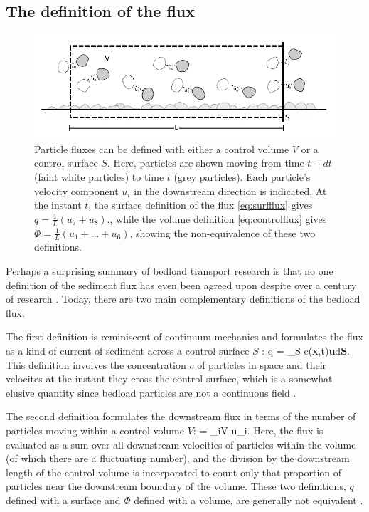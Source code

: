 \subsection{The definition of the flux}
\begin{figure}[!htbp]
	\includegraphics[width=\linewidth,keepaspectratio]{./figures/ch1/fluxDefinitions.pdf}
	\caption{Particle fluxes can be defined with either a control volume $V$ or a control surface $S$. Here, particles are shown moving from time $t-dt$ (faint white particles) to time $t$ (grey particles). Each particle's velocity component $u_i$ in the downstream direction is indicated. At the instant $t$, the surface definition of the flux \ref{eq:surfflux} gives $q = \frac{1}{L}(u_7+u_8).$, while the volume definition \ref{eq:controlflux} gives $\Phi = \frac{1}{L}(u_1+\dots+u_6)$,
	showing the non-equivalence of these two definitions.}
	\label{fig:fluxdefs}
\end{figure}
Perhaps a surprising summary of bedload transport research is that no one definition of the sediment flux has even been agreed upon despite over a century of research \citep{Ballio2018}.
Today, there are two main complementary definitions of the bedload flux. 

The first definition is reminiscent of continuum mechanics and formulates the flux as a kind of current of sediment across a control surface $S$ \citep{Furbish2012,Heyman2016, Ballio2014}: 
\be q = \int_S c(\textbf{x},t)\textbf{u}\cdot d\textbf{S}. \label{eq:surfflux} \ee
This definition involves the concentration $c$ of particles in space and their velocites at the instant they cross the control surface, which is a somewhat elusive quantity since bedload particles are not a continuous field \citep{Heyman2016}.

The second definition formulates the downstream flux in terms of the number of particles moving within a control volume $V$:
\be \Phi =  \sum_{i\in V} u_i. \label{eq:controlflux}\ee
Here, the flux is evaluated as a sum over all downstream velocities of particles within the volume (of which there are a fluctuating number), and the division by the downstream length of the control volume is incorporated to count only that proportion of particles near the downstream boundary of the volume. These two definitions, $q$ defined with a surface and $\Phi$ defined with a volume, are generally not equivalent \citep{Ancey2020a}.

